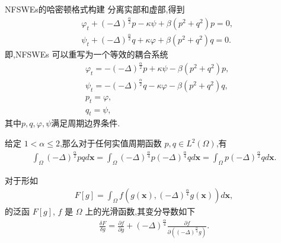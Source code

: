 \documentclass[aspectratio=169]{beamer}
\numberwithin{theorem}{section} %
\begin{document}
	\begin{frame}{NFSWEs的哈密顿格式构建}
		分离实部和虚部,得到
		\begin{align}
		&\varphi_{t}+\left( -\Delta \right) ^{\frac{\alpha }{2}}p-\kappa \psi+\beta \left( p^{2}+q^{2}\right)p=0,\nonumber\\
		&\psi_{t}+\left( -\Delta \right) ^{\frac{\alpha }{2}}q+\kappa \varphi+\beta \left( p^{2}+q^{2}\right)q=0.\label{eq_PAVF:29}
		\end{align}
		即,NFSWEs  可以重写为一个等效的耦合系统
		\begin{align}
		&\varphi_{t}=-\left( -\Delta \right) ^{\frac{\alpha }{2}}p+\kappa \psi-\beta \left( p^{2}+q^{2}\right)p\label{eq_PAVF:30},\\
		&\psi_{t}=-\left( -\Delta \right) ^{\frac{\alpha }{2}}q-\kappa \varphi-\beta \left( p^{2}+q^{2}\right)q\label{eq_PAVF:31},\\
		&p_t=\varphi, \label{eq_PAVF:32}\\
		&q_t=\psi, \label{eq_PAVF:33}
		\end{align}
		其中$p, q,\varphi,\psi$满足周期边界条件.
	\end{frame}
\begin{frame}%
	\begin{lemma}\label{lem_PAVF:1}
		\cite{fuStructurepreservingAlgorithmsTwodimensional2020} 
		 给定 $1<\alpha \leq 2$,那么对于任何实值周期函数 $p, q \in L^{2}(\Omega)$,有
		\begin{align}\label{eq_PAVF:22}
		\int_{\Omega}(-\Delta)^{\frac{\alpha}{2}} p q d \boldsymbol{x}=\int_{\Omega}(-\Delta)^{\frac{\alpha}{4}} p(-\Delta)^{\frac{\alpha}{4}} q d \boldsymbol{x}=\int_{\Omega} p(-\Delta)^{\frac{\alpha}{2}} q d \boldsymbol{x}.
		\end{align}
		\end{lemma}
		
\begin{lemma}\label{lem_PAVF:2}
	\cite{wangStructurepreservingNumericalMethods2018} 
	 对于形如
	\begin{align}\label{eq_PAVF:25}
	F[g]=\int_{\Omega} f\left(g(\boldsymbol{x}),(-\Delta)^{\frac{\alpha}{4}} g(\boldsymbol{x})\right) d \boldsymbol{x},
	\end{align}
	的泛函 $F[g]$, $f$ 是 $\Omega$ 上的光滑函数,其变分导数如下
	\begin{align}\label{eq_PAVF:26}
	\frac{\delta F}{\delta g}=\frac{\partial f}{\partial g}+(-\Delta)^{\frac{\alpha}{4}} \frac{\partial f}{\partial\left((-\Delta)^{\frac{\alpha}{4}} g\right)} .
	\end{align}
	\end{lemma}
	\end{frame}
\end{document}
